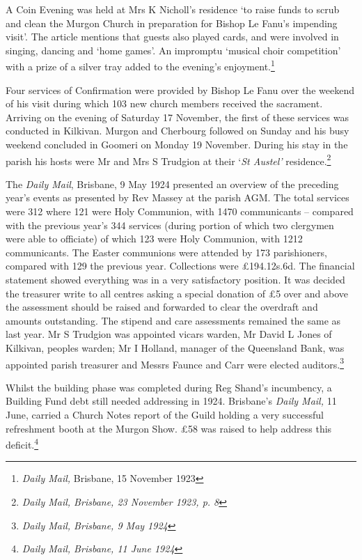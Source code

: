 A Coin Evening was held at Mrs K Nicholl's residence `to raise funds to scrub and clean the Murgon Church in preparation for Bishop Le Fanu's impending visit'. The article mentions that guests also played cards, and were involved in singing, dancing and `home games'. An impromptu `musical choir competition' with a prize of a silver tray added to the evening's enjoyment.\footnote{\emph{Daily Mail,} Brisbane, 15 November 1923}

Four services of Confirmation were provided by Bishop Le Fanu over the weekend of his visit during which 103 new church members received the sacrament. Arriving on the evening of Saturday 17 November, the first of these services was conducted in Kilkivan. Murgon and Cherbourg followed on Sunday and his busy weekend concluded in Goomeri on Monday 19 November. During his stay in the parish his hosts were Mr and Mrs S Trudgion at their `\emph{St Austel'} residence.\footnote{\emph{Daily Mail, Brisbane, 23 November 1923, p. 8}}

The \emph{Daily Mail}, Brisbane, 9 May 1924 presented an overview of the preceding year's events as presented by Rev Massey at the parish AGM. The total services were 312 where 121 were Holy Communion, with 1470 communicants -- compared with the previous year's 344 services (during portion of which two clergymen were able to officiate) of which 123 were Holy Communion, with 1212 communicants. The Easter communions were attended by 173 parishioners, compared with 129 the previous year. Collections were £194.12s.6d. The financial statement showed everything was in a very satisfactory position. It was decided the treasurer write to all centres asking a special donation of £5 over and above the assessment should be raised and forwarded to clear the overdraft and amounts outstanding. The stipend and care assessments remained the same as last year. Mr S Trudgion was appointed vicars warden, Mr David L Jones of Kilkivan, peoples warden; Mr I Holland, manager of the Queensland Bank, was appointed parish treasurer and Messrs Faunce and Carr were elected auditors.\footnote{\emph{Daily Mail, Brisbane, 9 May 1924}}

Whilst the building phase was completed during Reg Shand's incumbency, a Building Fund debt still needed addressing in 1924. Brisbane's \emph{Daily Mail,} 11 June, carried a Church Notes report of the Guild holding a very successful refreshment booth at the Murgon Show. £58 was raised to help address this deficit.\footnote{\emph{Daily Mail, Brisbane, 11 June 1924}}

